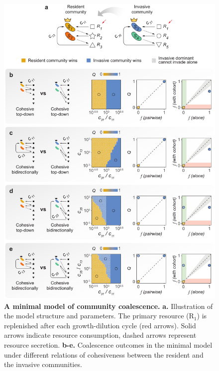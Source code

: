 \documentclass[a4paper,10pt]{article}
\begin{document}
\begin{figure}[!h]
\centering
\internallinenumbers
\includegraphics[scale=0.7,keepaspectratio]{figs/fig4_v3.pdf}
\caption{\textbf{A minimal model of community coalescence.}
\textbf{a.} Illustration of the model structure and parameters.
The primary resource ($\mathrm{R}_1$) is replenished after
each growth-dilution cycle (red arrows).
Solid arrows indicate resource consumption, dashed arrows represent
resource secretion.
\textbf{b-e.} Coalescence outcomes in the minimal model
under different relations of cohesiveness between the
resident and the invasive communities.}
\label{fig4}
\end{figure}

\clearpage
\end{document}
